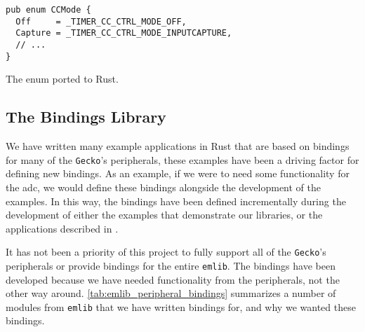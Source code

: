 \begin{listing}[h]
\begin{verbatim}
pub enum CCMode {
  Off     = _TIMER_CC_CTRL_MODE_OFF,
  Capture = _TIMER_CC_CTRL_MODE_INPUTCAPTURE,
  // ...
}
\end{verbatim}
\caption{The enum ported to Rust.}
\label{lst:enum_naming_rust}
\end{listing}

\subsection{The Bindings Library}
\label{ssub:the_bindings_library}

We have written many example applications in Rust that are based on bindings for many of the \texttt{Gecko}'s peripherals, these examples have been a driving factor for defining new bindings.
As an example, if we were to need some functionality for the \gls{adc}, we would define these bindings alongside the development of the examples.
In this way, the bindings have been defined incrementally during the development of either the examples that demonstrate our libraries, or the applications described in .

It has not been a priority of this project to fully support all of the \texttt{Gecko}'s peripherals or provide bindings for the entire \texttt{emlib}.
The bindings have been developed because we have needed functionality from the peripherals, not the other way around.
\autoref{tab:emlib_peripheral_bindings} summarizes a number of modules from \texttt{emlib} that we have written bindings for, and why we wanted these bindings.

